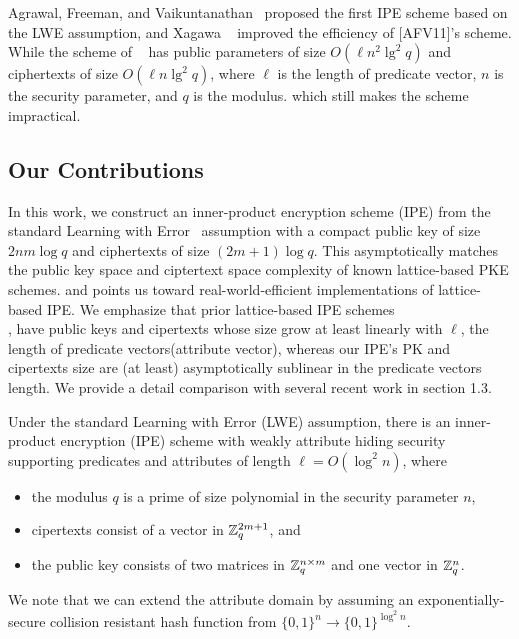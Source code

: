 Agrawal, Freeman, and Vaikuntanathan~ \cite{AC:AgrFreVai11} proposed the first IPE scheme based on the LWE assumption, and Xagawa ~\cite{PKC:Xagawa13} improved the efficiency of [AFV11]'s scheme. While the scheme of ~\cite{PKC:Xagawa13} has public parameters of size $O(\ell n^{2}\lg^{2}q)$ and ciphertexts of size $O(\ell n\lg^{2}q)$, where $\ell$ is the length of predicate vector, $n$ is the security parameter, and $q$ is the modulus. which still makes the scheme impractical.

\subsection{Our Contributions}
In this work, we construct an inner-product encryption scheme (IPE) from the standard Learning with Error~ \cite{STOC:Regev05} assumption with a compact public key of size $2nm\log q$ and ciphertexts of size $(2m+1)\log q$. This asymptotically matches the public key space and ciptertext space complexity of known lattice-based PKE schemes. and points us toward real-world-efficient implementations of lattice-based IPE. We emphasize that prior lattice-based IPE schemes\\ \cite{AC:AgrFreVai11}, \cite{PKC:Xagawa13} have public keys and cipertexts whose size grow at least linearly with $\ell$, the length of predicate vectors(attribute vector), whereas our IPE's PK and cipertexts size are (at least) asymptotically sublinear in the predicate vectors length. We provide a detail comparison with several recent work in section 1.3.
\begin{theorem}[Main]
Under the standard Learning with Error (LWE) assumption, there is an inner-product encryption (IPE) scheme with weakly attribute hiding security supporting predicates and attributes of length $\ell=O(\log^{2} n)$, where
\begin{itemize}
 \item the modulus $q$ is a prime of size polynomial in the security parameter $n$,\\
 \item cipertexts consist of a vector in $\mathbb{Z}^{2m+1}_{q}$, and\\
 \item the public key consists of two matrices in $\mathbb{Z}^{n \times m}_{q}$ and one vector in $\mathbb{Z}^{n}_{q}$.
\end{itemize}
\end{theorem}
We note that we can extend the attribute domain by assuming an exponentially-secure collision resistant hash function from $\{0,1\}^{n}\rightarrow \{0,1\}^{\log^{2}n}$.\

